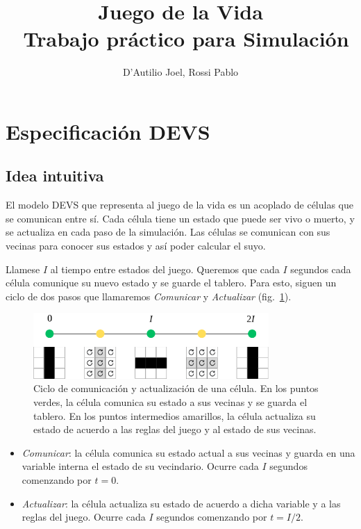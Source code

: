 \documentclass[12pt]{article}
\title{Juego de la Vida\\
\large~Trabajo práctico para Simulación}
\author{D'Autilio Joel, Rossi Pablo}
\date{}
\begin{document}
\maketitle

\section{Especificación DEVS}


\subsection{Idea intuitiva}


El modelo DEVS que representa al juego de la vida es un acoplado de células que se comunican entre sí. Cada célula tiene un estado que puede ser vivo o muerto, y se actualiza en cada paso de la simulación. Las células se comunican con sus vecinas para conocer sus estados y así poder calcular el suyo.

Llamese $I$ al tiempo entre estados del juego. Queremos que cada $I$ segundos cada célula comunique su nuevo estado y se guarde el tablero. Para esto, siguen un ciclo de dos pasos que llamaremos \textit{Comunicar} y \textit{Actualizar} (fig.~\ref{img:timeline}).

\begin{figure}[ht]
  \centering
  \includegraphics[width=0.8\textwidth]{imagenes/timeline}
  \caption{Ciclo de comunicación y actualización de una célula. En los puntos verdes, la célula comunica su estado a sus vecinas y se guarda el tablero. En los puntos intermedios amarillos, la célula actualiza su estado de acuerdo a las reglas del juego y al estado de sus vecinas.}\label{img:timeline}
\end{figure}

\begin{itemize}
  \item \textit{Comunicar}: la célula comunica su estado actual a sus vecinas y guarda en una variable interna el estado de su vecindario. Ocurre cada $I$ segundos comenzando por $t = 0$.
  \item \textit{Actualizar}: la célula actualiza su estado de acuerdo a dicha variable y a las reglas del juego. Ocurre cada $I$ segundos comenzando por $t = I/2$.
\end{itemize}
\end{document}

